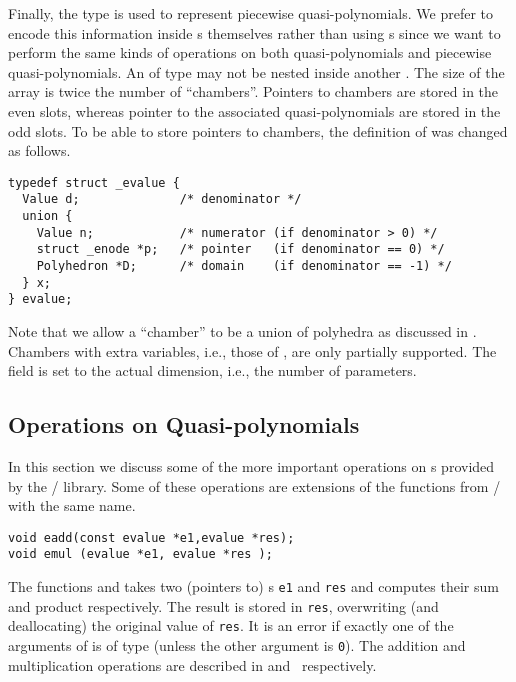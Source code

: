 Finally, the  type is used to
represent piecewise quasi-polynomials.
We prefer to encode this information inside s
themselves
rather than using s since we want
to perform the same kinds of operations on both quasi-polynomials
and piecewise quasi-polynomials.
An  of type  may not be nested
inside another .
The size of the array is twice the number of ``chambers''.
Pointers to chambers are stored in the even slots,
whereas pointer to the associated quasi-polynomials
are stored in the odd slots.
To be able to store pointers to chambers, the
definition of  was changed as follows.
\begin{verbatim}
typedef struct _evalue {
  Value d;              /* denominator */
  union {
    Value n;            /* numerator (if denominator > 0) */
    struct _enode *p;   /* pointer   (if denominator == 0) */
    Polyhedron *D;      /* domain    (if denominator == -1) */
  } x;
} evalue;
\end{verbatim}
Note that we allow a ``chamber'' to be a union of polyhedra
as discussed in .
Chambers with extra variables, i.e., those of
,
are only partially supported.
The field  is set to the actual dimension,
i.e., the number of parameters.

\subsection{Operations on Quasi-polynomials}
\label{a:operations}

In this section we discuss some of the more important
operations on s provided by the
\barvinok/ library.
Some of these operations are extensions
of the functions from \PolyLib/ with the same name.

\begin{verbatim}
void eadd(const evalue *e1,evalue *res);
void emul (evalue *e1, evalue *res );
\end{verbatim}
The functions  and  takes
two (pointers to) s \verb+e1+ and \verb+res+
and computes their sum and product respectively.
The result is stored in \verb+res+, overwriting (and deallocating)
the original value of \verb+res+.
It is an error if exactly one of
the arguments of  is of type 
(unless the other argument is \verb+0+).
The addition and multiplication operations are described
in  
and~
respectively.


